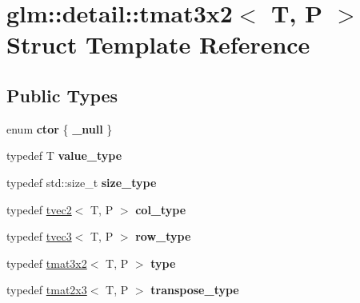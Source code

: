 \hypertarget{structglm_1_1detail_1_1tmat3x2}{\section{glm\-:\-:detail\-:\-:tmat3x2$<$ T, P $>$ Struct Template Reference}
\label{structglm_1_1detail_1_1tmat3x2}
}
\subsection*{Public Types}
\begin{DoxyCompactItemize}
\item 
enum {\bfseries ctor} \{ {\bfseries \-\_\-null}
 \}
\item 
\hypertarget{structglm_1_1detail_1_1tmat3x2_a3a0297927f3affe894622f9496b66db4}{typedef T {\bfseries value\-\_\-type}}\label{structglm_1_1detail_1_1tmat3x2_a3a0297927f3affe894622f9496b66db4}

\item 
\hypertarget{structglm_1_1detail_1_1tmat3x2_af70231300959702a284387cd047e5802}{typedef std\-::size\-\_\-t {\bfseries size\-\_\-type}}\label{structglm_1_1detail_1_1tmat3x2_af70231300959702a284387cd047e5802}

\item 
\hypertarget{structglm_1_1detail_1_1tmat3x2_a9c0f2cfe8e359b2917b5f616a5dbc9e4}{typedef \hyperlink{structglm_1_1detail_1_1tvec2}{tvec2}$<$ T, P $>$ {\bfseries col\-\_\-type}}\label{structglm_1_1detail_1_1tmat3x2_a9c0f2cfe8e359b2917b5f616a5dbc9e4}

\item 
\hypertarget{structglm_1_1detail_1_1tmat3x2_a4e9b5f959b95a291c070d0f60195306f}{typedef \hyperlink{structglm_1_1detail_1_1tvec3}{tvec3}$<$ T, P $>$ {\bfseries row\-\_\-type}}\label{structglm_1_1detail_1_1tmat3x2_a4e9b5f959b95a291c070d0f60195306f}

\item 
\hypertarget{structglm_1_1detail_1_1tmat3x2_ae5d42d3fe65b97066f5a74e2da7015e3}{typedef \hyperlink{structglm_1_1detail_1_1tmat3x2}{tmat3x2}$<$ T, P $>$ {\bfseries type}}\label{structglm_1_1detail_1_1tmat3x2_ae5d42d3fe65b97066f5a74e2da7015e3}

\item 
\hypertarget{structglm_1_1detail_1_1tmat3x2_acb1e7f53f46b54ebb6699582fa1c4b71}{typedef \hyperlink{structglm_1_1detail_1_1tmat2x3}{tmat2x3}$<$ T, P $>$ {\bfseries transpose\-\_\-type}}\label{structglm_1_1detail_1_1tmat3x2_acb1e7f53f46b54ebb6699582fa1c4b71}

\end{DoxyCompactItemize}
